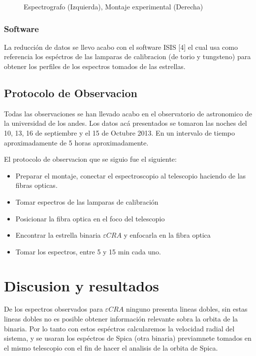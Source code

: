 \documentclass[Proceedings]{ascelike}
\begin{document}
\begin{figure}
\caption{Espectrografo (Izquierda), Montaje experimental (Derecha)\label{espectrografo}}
\end{figure}



\subsubsection{Software}

La reducci\'on de datos se llevo acabo con el software ISIS [4]
el cual usa como referencia los esp\'ectros de las lamparas de calibracion (de torio y tungsteno)
para obtener los perfiles de los espectros tomados de las estrellas.

\subsection{Protocolo de Observacion}

Todas las observaciones se han llevado acabo en el observatorio de astronomico
de la universidad de los andes. Los datos ac\'a presentados se tomaron las noches
del 10, 13, 16 de septiembre y el 15 de Octubre 2013. En un intervalo de tiempo aproximadamente de 5 horas aproximadamente. 

El protocolo de observacion que se siguio fue el siguiente:

\begin{itemize}
\item Preparar el montaje, conectar el espectroscopio al telescopio haciendo de las 
fibras opticas.
\item Tomar espectros de las lamparas de calibraci\'on 
\item Posicionar la fibra optica en el foco del telescopio
\item Encontrar la estrella binaria $\varepsilon CRA$ y enfocarla en la fibra optica
\item Tomar los espectros, entre 5 y 15 min cada uno.
\end{itemize}

\section{Discusion y resultados}

De los espectros observados para $\varepsilon CRA$ ninguno presenta 
lineas dobles, sin estas lineas dobles no es posible obtener informaci\'on 
relevante sobra la orbita de la binaria. Por lo tanto con estos esp\'ectros
calcularemos la velocidad radial del sistema, y se usaran los esp\'ectros
de Spica (otra binaria) previamnete tomados en el mismo telescopio con el fin de hacer el analisis de la orbita de Spica.
\end{document}
